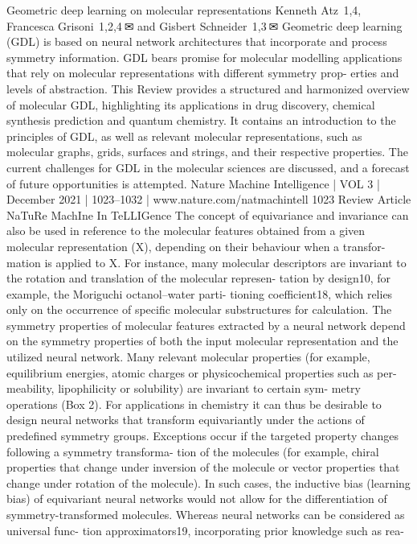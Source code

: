 Geometric deep learning on molecular
representations
Kenneth Atz   1,4, Francesca Grisoni   1,2,4 ✉ and Gisbert Schneider   1,3 ✉
Geometric deep learning (GDL) is based on neural network architectures that incorporate and process symmetry information.
GDL bears promise for molecular modelling applications that rely on molecular representations with different symmetry prop-
erties and levels of abstraction. This Review provides a structured and harmonized overview of molecular GDL, highlighting
its applications in drug discovery, chemical synthesis prediction and quantum chemistry. It contains an introduction to the
principles of GDL, as well as relevant molecular representations, such as molecular graphs, grids, surfaces and strings, and
their respective properties. The current challenges for GDL in the molecular sciences are discussed, and a forecast of future
opportunities is attempted.
Nature Machine Intelligence | VOL 3 | December 2021 | 1023–1032 | www.nature.com/natmachintell
1023
Review Article
NaTuRe MachIne In TeLLIGence
The concept of equivariance and invariance can also be used in
reference to the molecular features obtained from a given molecular
representation (X), depending on their behaviour when a transfor-
mation is applied to X. For instance, many molecular descriptors are
invariant to the rotation and translation of the molecular represen-
tation by design10, for example, the Moriguchi octanol–water parti-
tioning coefficient18, which relies only on the occurrence of specific
molecular substructures for calculation. The symmetry properties
of molecular features extracted by a neural network depend on the
symmetry properties of both the input molecular representation
and the utilized neural network.
Many relevant molecular properties (for example, equilibrium
energies, atomic charges or physicochemical properties such as per-
meability, lipophilicity or solubility) are invariant to certain sym-
metry operations (Box 2). For applications in chemistry it can thus
be desirable to design neural networks that transform equivariantly
under the actions of predefined symmetry groups. Exceptions occur
if the targeted property changes following a symmetry transforma-
tion of the molecules (for example, chiral properties that change
under inversion of the molecule or vector properties that change
under rotation of the molecule). In such cases, the inductive bias
(learning bias) of equivariant neural networks would not allow for
the differentiation of symmetry-transformed molecules.
Whereas neural networks can be considered as universal func-
tion approximators19, incorporating prior knowledge such as rea-
